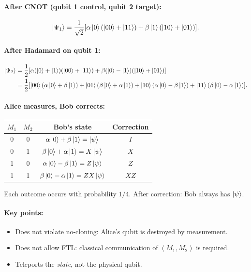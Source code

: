 \documentclass[10pt,a4paper]{article}
\begin{document}
\paragraph{After CNOT (qubit 1 control, qubit 2 target):}
\[
\ket{\Psi_1}=\frac{1}{\sqrt{2}}[\alpha\ket{0}(\ket{00}+\ket{11})+\beta\ket{1}(\ket{10}+\ket{01})].
\]

\paragraph{After Hadamard on qubit 1:}
\begin{align*}
\ket{\Psi_2}&=\frac{1}{2}[\alpha(\ket{0}+\ket{1})(\ket{00}+\ket{11})+\beta(\ket{0}-\ket{1})(\ket{10}+\ket{01})]\\
&=\frac{1}{2}[\ket{00}(\alpha\ket{0}+\beta\ket{1})+\ket{01}(\beta\ket{0}+\alpha\ket{1})+\ket{10}(\alpha\ket{0}-\beta\ket{1})+\ket{11}(\beta\ket{0}-\alpha\ket{1})].
\end{align*}

\paragraph{Alice measures, Bob corrects:}
\begin{center}
\begin{tabular}{cccc}
$M_1$ & $M_2$ & Bob's state & Correction \\\hline
0 & 0 & $\alpha\ket{0}+\beta\ket{1}=\ket{\psi}$ & $I$ \\
0 & 1 & $\beta\ket{0}+\alpha\ket{1}=X\ket{\psi}$ & $X$ \\
1 & 0 & $\alpha\ket{0}-\beta\ket{1}=Z\ket{\psi}$ & $Z$ \\
1 & 1 & $\beta\ket{0}-\alpha\ket{1}=ZX\ket{\psi}$ & $XZ$ \\
\end{tabular}
\end{center}

Each outcome occurs with probability $1/4$. After correction: Bob always has $\ket{\psi}$.

\paragraph{Key points:}
\begin{itemize}[nosep]
\item Does not violate no-cloning: Alice's qubit is destroyed by measurement.
\item Does not allow FTL: classical communication of $(M_1,M_2)$ is required.
\item Teleports the \emph{state}, not the physical qubit.
\end{itemize}
\end{document}
